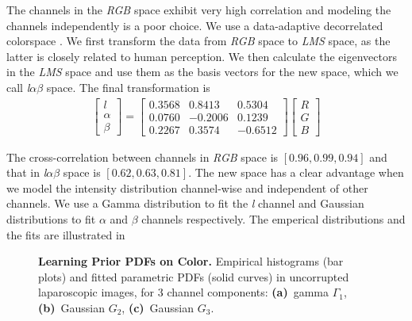 The channels in the \emph{RGB} space exhibit very high correlation and modeling the channels independently is a poor choice. We use a data-adaptive decorrelated colorspace \cite{reinhard2001color}. We first transform the data from \emph{RGB} space to \emph{LMS} space, as the latter is closely related to human perception. We then calculate the eigenvectors in the \emph{LMS} space and use them as the basis vectors for the new space, which we call \emph{l$\alpha\beta$} space. The final transformation is 
\begin{align}
    \begin{bmatrix}
    l \\ \alpha \\ \beta
    \end{bmatrix}
    = 
    \begin{bmatrix}
    0.3568 & 0.8413 & 0.5304 \\
    0.0760 & -0.2006 & 0.1239 \\
    0.2267 & 0.3574 & -0.6512  
    \end{bmatrix}
    \begin{bmatrix}
    R \\ G \\ B
    \end{bmatrix}
\end{align}

The cross-correlation between channels in \emph{RGB} space is $\left[ 0.96, 0.99, 0.94\right]$ and that in \emph{l$\alpha\beta$} space is $\left[ 0.62, 0.63, 0.81 \right]$. The new space has a clear advantage when we model the intensity distribution channel-wise and independent of other channels. We use a Gamma distribution to fit the \textit{l} channel and Gaussian distributions to fit $\alpha$ and $\beta$ channels respectively. The emperical distributions and the fits are illustrated in 

\begin{figure}[!t]
    \caption
    {
        {\bf Learning Prior PDFs on Color.}
        Empirical histograms (bar plots) and fitted parametric PDFs (solid curves) in uncorrupted laparoscopic images, for 3 channel components: {\bf
            (a)}~gamma $\Gamma_1$, {\bf (b)}~Gaussian $G_2$, {\bf (c)}~Gaussian $G_3$.
    }
    \label{fig:intensityDist}
\end{figure}


